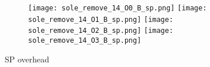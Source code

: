 \documentclass[11pt]{article}
\begin{document}
    \begin{figure}[!htb]
        \begin{subfigure}{\linewidth}
            \texttt{[image: sole\_remove\_14\_O0\_B\_sp.png]}
            \texttt{[image: sole\_remove\_14\_O1\_B\_sp.png]}
            \texttt{[image: sole\_remove\_14\_O2\_B\_sp.png]}
            \texttt{[image: sole\_remove\_14\_O3\_B\_sp.png]}
        \end{subfigure}\par\medskip
        \caption{SP overhead}\label{fig:figure8}
    \end{figure}
\end{document}
